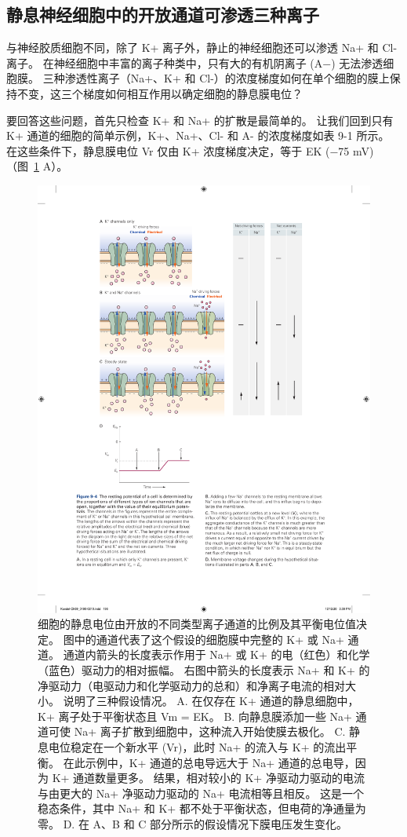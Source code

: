 \subsection{静息神经细胞中的开放通道可渗透三种离子}

与神经胶质细胞不同，除了 K+ 离子外，静止的神经细胞还可以渗透 Na+ 和 Cl- 离子。
在神经细胞中丰富的离子种类中，只有大的有机阴离子 (A−) 无法渗透细胞膜。
三种渗透性离子（Na+、K+ 和 Cl-）的浓度梯度如何在单个细胞的膜上保持不变，这三个梯度如何相互作用以确定细胞的静息膜电位？


要回答这些问题，首先只检查 K+ 和 Na+ 的扩散是最简单的。
让我们回到只有 K+ 通道的细胞的简单示例，K+、Na+、Cl- 和 A- 的浓度梯度如表 9-1 所示。
在这些条件下，静息膜电位 Vr 仅由 K+ 浓度梯度决定，等于 EK (−75 mV)（图~\ref{fig:9_4} A）。


\begin{figure}[htbp]
	\centering
	\includegraphics[width=0.7\linewidth]{chap09/fig_9_4}
	\caption{细胞的静息电位由开放的不同类型离子通道的比例及其平衡电位值决定。 图中的通道代表了这个假设的细胞膜中完整的 K+ 或 Na+ 通道。 通道内箭头的长度表示作用于 Na+ 或 K+ 的电（红色）和化学（蓝色）驱动力的相对振幅。 右图中箭头的长度表示 Na+ 和 K+ 的净驱动力（电驱动力和化学驱动力的总和）和净离子电流的相对大小。 说明了三种假设情况。 A. 在仅存在 K+ 通道的静息细胞中，K+ 离子处于平衡状态且 Vm = EK。 B. 向静息膜添加一些 Na+ 通道可使 Na+ 离子扩散到细胞中，这种流入开始使膜去极化。 C. 静息电位稳定在一个新水平 (Vr)，此时 Na+ 的流入与 K+ 的流出平衡。 在此示例中，K+ 通道的总电导远大于 Na+ 通道的总电导，因为 K+ 通道数量更多。 结果，相对较小的 K+ 净驱动力驱动的电流与由更大的 Na+ 净驱动力驱动的 Na+ 电流相等且相反。 这是一个稳态条件，其中 Na+ 和 K+ 都不处于平衡状态，但电荷的净通量为零。 D. 在 A、B 和 C 部分所示的假设情况下膜电压发生变化。}
	\label{fig:9_4}
\end{figure}


